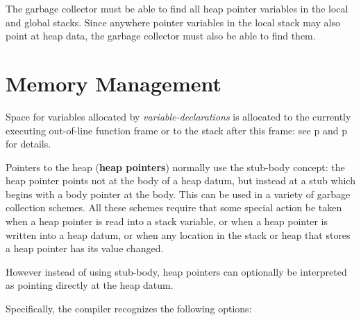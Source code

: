 \documentclass[12pt]{article}
\newcommand{\skey}[2]{{\rm \bfseries #1#2}}
\newcommand{\pagref}[1]{p\pageref{#1}}
\begin{document}
The garbage collector must be able to find all heap pointer variables
in the local and global stacks.  Since anywhere pointer variables in
the local stack may also point at heap data, the garbage collector
must also be able to find them.


\section{Memory Management}
\label{MEMORY-MANAGEMENT}

Space for variables allocated by {\em variable-declarations}
is allocated to the currently executing out-of-line function
frame or to the stack after this frame: see
\pagref{VARIABLE-ALLOCATION} and \pagref{LOOP-ALLOCATION}
for details.

Pointers to the heap (\skey{heap pointer}s) normally use the stub-body concept:
the heap pointer points not at the body of a heap datum, but instead at a
stub which begins with a body pointer at the body.  This can be
used in a variety of garbage collection schemes.  All these
schemes require that some special action be taken when a heap
pointer is read into a stack variable, or when
a heap pointer is written into a heap datum, or when any location
in the stack or heap that stores a heap pointer has its value
changed.

However instead of using stub-body, heap pointers can optionally be
interpreted as pointing directly at the heap datum.

Specifically, the compiler recognizes the following options:
\end{document}
